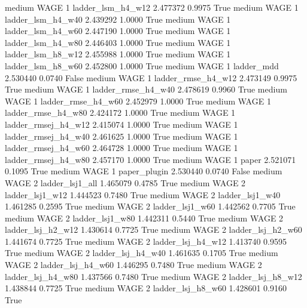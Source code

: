     medium     WAGE                 1   ladder_lsm_h4_w12   2.477372      0.9975    True
    medium     WAGE                 1   ladder_lsm_h4_w40   2.439292      1.0000    True
    medium     WAGE                 1   ladder_lsm_h4_w60   2.447190      1.0000    True
    medium     WAGE                 1   ladder_lsm_h4_w80   2.446403      1.0000    True
    medium     WAGE                 1   ladder_lsm_h8_w12   2.455988      1.0000    True
    medium     WAGE                 1   ladder_lsm_h8_w60   2.452800      1.0000    True
    medium     WAGE                 1          ladder_mdd   2.530440      0.0740   False
    medium     WAGE                 1  ladder_rmse_h4_w12   2.473149      0.9975    True
    medium     WAGE                 1  ladder_rmse_h4_w40   2.478619      0.9960    True
    medium     WAGE                 1  ladder_rmse_h4_w60   2.452979      1.0000    True
    medium     WAGE                 1  ladder_rmse_h4_w80   2.424172      1.0000    True
    medium     WAGE                 1 ladder_rmsej_h4_w12   2.415074      1.0000    True
    medium     WAGE                 1 ladder_rmsej_h4_w40   2.461625      1.0000    True
    medium     WAGE                 1 ladder_rmsej_h4_w60   2.464728      1.0000    True
    medium     WAGE                 1 ladder_rmsej_h4_w80   2.457170      1.0000    True
    medium     WAGE                 1               paper   2.521071      0.1095    True
    medium     WAGE                 1        paper_plugin   2.530440      0.0740   False
    medium     WAGE                 2     ladder_lsj1_all   1.465079      0.4785    True
    medium     WAGE                 2     ladder_lsj1_w12   1.444523      0.7480    True
    medium     WAGE                 2     ladder_lsj1_w40   1.461285      0.2595    True
    medium     WAGE                 2     ladder_lsj1_w60   1.442562      0.7705    True
    medium     WAGE                 2     ladder_lsj1_w80   1.442311      0.5440    True
    medium     WAGE                 2   ladder_lsj_h2_w12   1.430614      0.7725    True
    medium     WAGE                 2   ladder_lsj_h2_w60   1.441674      0.7725    True
    medium     WAGE                 2   ladder_lsj_h4_w12   1.413740      0.9595    True
    medium     WAGE                 2   ladder_lsj_h4_w40   1.461635      0.1705    True
    medium     WAGE                 2   ladder_lsj_h4_w60   1.446295      0.7480    True
    medium     WAGE                 2   ladder_lsj_h4_w80   1.437566      0.7480    True
    medium     WAGE                 2   ladder_lsj_h8_w12   1.438844      0.7725    True
    medium     WAGE                 2   ladder_lsj_h8_w60   1.428601      0.9160    True
